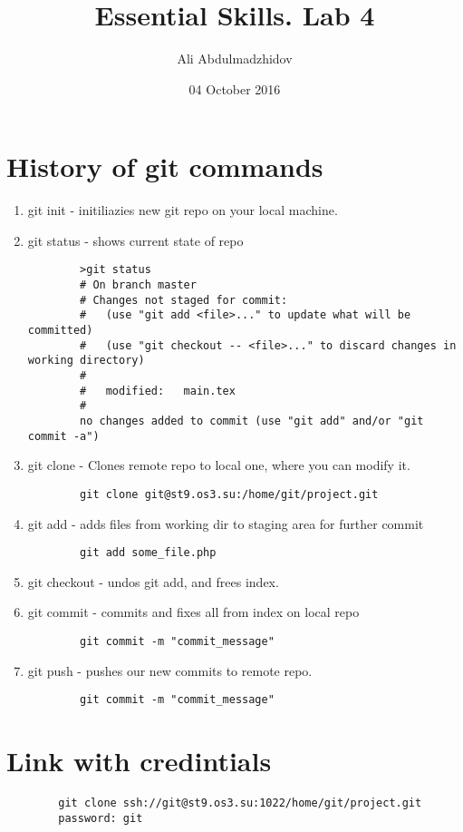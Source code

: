 \documentclass[10pt]{article}
\title{Essential Skills. Lab 4}
\date{04 October 2016}
\author{Ali Abdulmadzhidov}
\begin{document}
\renewcommand*\rmdefault{cmss}
\maketitle
\section{History of git commands}
\begin{enumerate}
    \item git init - initiliazies new git repo on your local machine.
    \item git status - shows current state of repo
    \begin{verbatim}
        >git status
        # On branch master
        # Changes not staged for commit:
        #   (use "git add <file>..." to update what will be committed)
        #   (use "git checkout -- <file>..." to discard changes in working directory)
        #
        #   modified:   main.tex
        #
        no changes added to commit (use "git add" and/or "git commit -a")
    \end{verbatim}
    \item git clone - Clones remote repo to local one, where you can modify it.
    \begin{verbatim}
        git clone git@st9.os3.su:/home/git/project.git
    \end{verbatim}
    \item git add - adds files from working dir to staging area for further commit
    \begin{verbatim}
        git add some_file.php
    \end{verbatim}
    \item git checkout - undos git add, and frees index.
    \item git commit - commits and fixes all from index on local repo
    \begin{verbatim}
        git commit -m "commit_message"
    \end{verbatim}
    \item git push - pushes our new commits to remote repo.
    \begin{verbatim}
        git commit -m "commit_message"
    \end{verbatim}
\end{enumerate}

\section{Link with credintials}
    \begin{verbatim}
        git clone ssh://git@st9.os3.su:1022/home/git/project.git
        password: git
    \end{verbatim}
\end{document}
